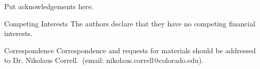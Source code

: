 \documentclass{nature}
\begin{document}






\begin{addendum}
 \item Put acknowledgements here.
 \item[Competing Interests] The authors declare that they have no
competing financial interests.
 \item[Correspondence] Correspondence and requests for materials
should be addressed to Dr. Nikolaus Correll.~(email: nikolaus.correll@colorado.edu).
\end{addendum}

\end{document}
